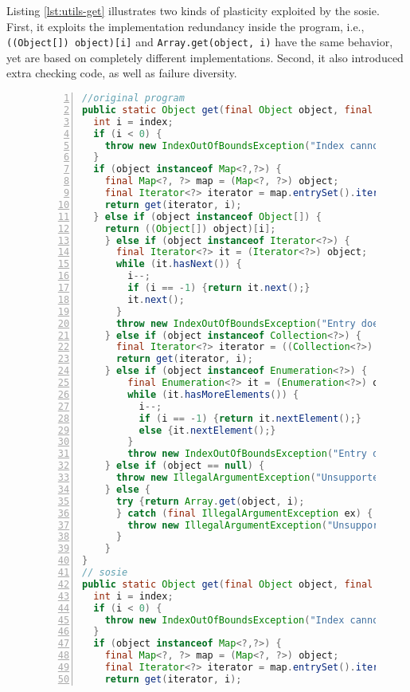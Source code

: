 Listing \ref{lst:utils-get} illustrates two kinds of plasticity exploited by the sosie. 
First, it exploits the implementation redundancy inside the program, i.e., \texttt{((Object[]) object)[i]} and \texttt{Array.get(object, i)} have the same behavior, yet are based on completely different implementations. 
Second, it also introduced extra checking code, as well as failure diversity.

\begin{figure}[ht]
\begin{lstlisting}[caption={\texttt{get} in commons.collection},label={lst:utils-get},language=java,numbers=left]
//original program
public static Object get(final Object object, final int index) {
  int i = index;
  if (i < 0) {
    throw new IndexOutOfBoundsException("Index cannot be negative: " + i);
  }
  if (object instanceof Map<?,?>) {
    final Map<?, ?> map = (Map<?, ?>) object;
    final Iterator<?> iterator = map.entrySet().iterator();
    return get(iterator, i);
  } else if (object instanceof Object[]) {
    return ((Object[]) object)[i];
    } else if (object instanceof Iterator<?>) {
      final Iterator<?> it = (Iterator<?>) object;
      while (it.hasNext()) {
        i--;
        if (i == -1) {return it.next();}
        it.next();
      }
      throw new IndexOutOfBoundsException("Entry does not exist: " + i);
    } else if (object instanceof Collection<?>) {
      final Iterator<?> iterator = ((Collection<?>) object).iterator();
      return get(iterator, i);
    } else if (object instanceof Enumeration<?>) {
        final Enumeration<?> it = (Enumeration<?>) object;
        while (it.hasMoreElements()) {
          i--;
          if (i == -1) {return it.nextElement();} 
          else {it.nextElement();}
        }
        throw new IndexOutOfBoundsException("Entry does not exist: " + i);
    } else if (object == null) {
      throw new IllegalArgumentException("Unsupported object type: null");
    } else {
      try {return Array.get(object, i);
      } catch (final IllegalArgumentException ex) {
        throw new IllegalArgumentException("Unsupported object type: " + object.getClass().getName());
      }
    }
}
// sosie  
public static Object get(final Object object, final int index) {
  int i = index;
  if (i < 0) {
    throw new IndexOutOfBoundsException("Index cannot be negative: " + i);
  }
  if (object instanceof Map<?,?>) {
    final Map<?, ?> map = (Map<?, ?>) object;
    final Iterator<?> iterator = map.entrySet().iterator();
    return get(iterator, i);

\end{lstlisting}
\end{figure}
